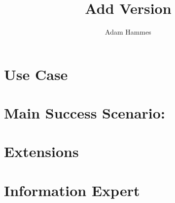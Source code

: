 \documentclass{article}
\title{Add Version}
\author{Adam Hammes}
\begin{document}
\maketitle

\section*{Use Case}

\section*{Main Success Scenario:}

\section*{Extensions}

\section*{Information Expert}
\end{document}
